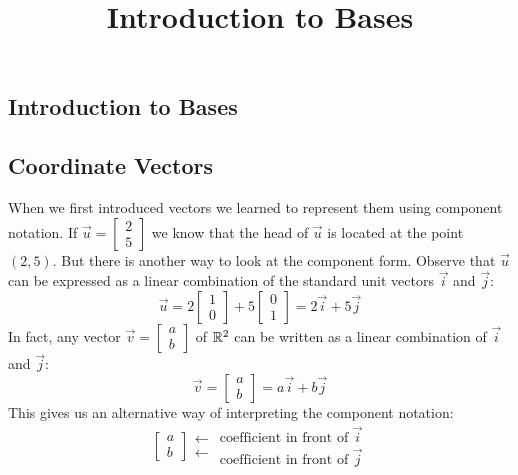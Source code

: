 \documentclass{ximera}
\title{Introduction to Bases} \license{CC BY-NC-SA 4.0}
\begin{document}
\begin{abstract}

\end{abstract}
\maketitle
\begin{onlineOnly}
\section*{Introduction to Bases}
\end{onlineOnly}

\subsection*{Coordinate Vectors}
When we first introduced vectors we learned to represent them using component notation.  If $\vec{u}=\begin{bmatrix}2\\5\end{bmatrix}$ we know that the head of $\vec{u}$ is located at the point $(2, 5)$.  But there is another way to look at the component form.  Observe that $\vec{u}$ can be expressed as a linear combination of the standard unit vectors $\vec{i}$ and $\vec{j}$:
$$\vec{u}=2\begin{bmatrix}1\\0\end{bmatrix}+5\begin{bmatrix}0\\1\end{bmatrix}=2\vec{i}+5\vec{j}$$
In fact, any vector $\vec{v}=\begin{bmatrix}a\\b\end{bmatrix}$ of $\mathbb{R}^2$ can be written as a linear combination of $\vec{i}$ and $\vec{j}$:
$$\vec{v}=\begin{bmatrix}a\\b\end{bmatrix}=a\vec{i}+b\vec{j}$$
This gives us an alternative way of interpreting the component notation:
$$\left[\begin{array}{c}  
 a\\b
 \end{array}\right]
 \begin{array}{c}
 \longleftarrow\\
 \longleftarrow
 \end{array}
\begin{array}{c}  
 \mbox{coefficient in front of $\vec{i}$}\\\mbox{coefficient in front of $\vec{j}$}
 \end{array}$$
 
\end{document}
